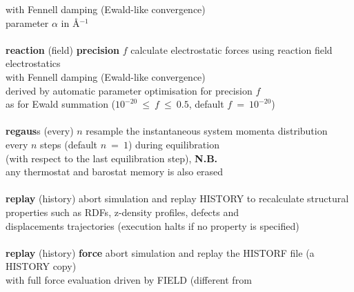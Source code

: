\begin{tabbing}
\>                                              \> with Fennell \cite{fennell-06a} damping (Ewald-like convergence) \\
\>                                              \> parameter $\alpha$ in \AA$^{-1}$ \\
\>                                              \> \\
\> {\bf reaction} (field) {\bf precision} $f$   \> calculate electrostatic forces using reaction field electrostatics \\
\>                                              \> with Fennell \cite{fennell-06a} damping (Ewald-like convergence) \\
\>                                              \> derived by automatic parameter optimisation for precision $f$ \\
\>                                              \> as for Ewald summation ($10^{-20}~\le~f~\le~0.5$, default $f~=~10^{-20}$) \\
\>                                              \> \\
\> {\bf regaus}s (every) $n$                    \> resample the instantaneous system momenta distribution \\
\>                                              \> every $n$ steps (default $n~=~1$) during equilibration \\
\>                                              \> (with respect to the last equilibration step), {\bf N.B.} \\
\>                                              \> any thermostat and barostat memory is also erased \\
\>                                              \> \\
\> {\bf replay} (history)                       \> abort simulation and replay HISTORY to recalculate structural \\
\>                                              \> properties such as RDFs, z-density profiles, defects and \\
\>                                              \> displacements trajectories (execution halts if no property is specified) \\
\>                                              \> \\
\> {\bf replay} (history) {\bf force}           \> abort simulation and replay the HISTORF file (a HISTORY copy) \\
\>                                              \> with full force evaluation driven by FIELD (different from \\

\end{tabbing}
